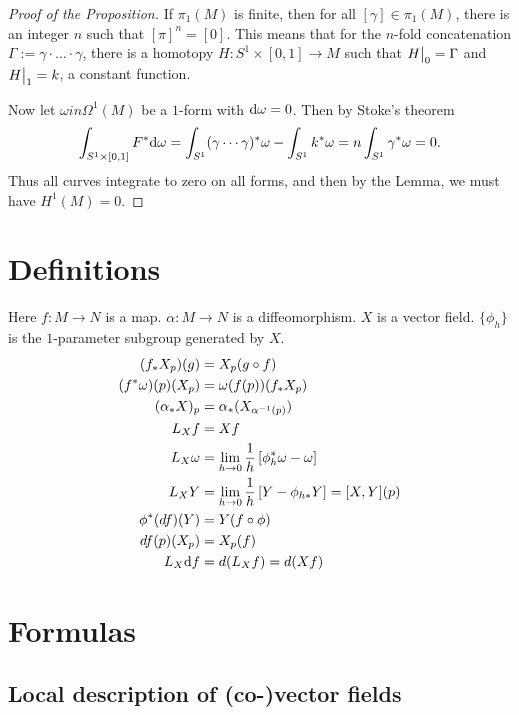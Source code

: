 \documentclass[11pt, english]{article}
\begin{document}
\begin{proof}[Proof of the Proposition]
If $\pi_1(M)$ is finite, then for all $[\gamma] \in \pi_1(M)$, there is an integer $n$ such that $[\pi]^n = [0]$. This means that for the $n$-fold concatenation $\Gamma := \gamma \cdot \ldots \cdot \gamma$, there is a homotopy $H:S^1 \times [0,1] \to M$ such that $\restr{H}{0}=\Gamma$ and $\restr{H}{1}=k$, a constant function. 

Now let $\omega in \Omega^1(M)$ be a $1$-form with $\mathrm{d}{\omega} = 0$. Then by Stoke's theorem
\[
\int_{S^1 \times [0,1]} F^\ast \mathrm{d}{\omega} = \int_{S^1} (\gamma \cdots \gamma)^\ast \omega - \int_{S^1} k^\ast \omega = n \int_{S^1} \gamma^\ast \omega = 0.
\]
Thus all curves integrate to zero on all forms, and then by the Lemma, we must have $H^1(M)=0$.
\end{proof}



\newpage
\appendix
\newpage
\section{Definitions}
Here $f:M \to N$ is a map. $\alpha:M \to N$ is a diffeomorphism. $X$ is a vector field. $\{ \phi_h \}$ is the $1$-parameter subgroup generated by $X$.
\begin{align*}
  (f_\ast X_p)(g) &= X_p(g \circ f) \\
(f^\ast \omega)(p)(X_p) &= \omega(f(p))(f_\ast X_p) \\
(\alpha_\ast X)_p &= \alpha_\ast(X_{\alpha^{-1}(p)}) \\
L_X f &= Xf \\
L_X \omega &= \lim_{h \to 0} \frac 1h \left[ \phi_h^\ast \omega -\omega \right] \\
L_XY &= \lim_{h \to 0} \frac 1h \left[Y - \phi_{h \ast} Y \right] = [X,Y](p) \\
\phi^\ast(df)(Y) &= Y(f \circ \phi) \\
df(p)(X_p) &= X_p(f) \\
L_X \mathrm{d}{f} &= d(L_X f) = d(Xf) \\ 
\end{align*}

\newpage
\section{Formulas}
 
\subsection{Local description of (co-)vector fields}
\end{document}
